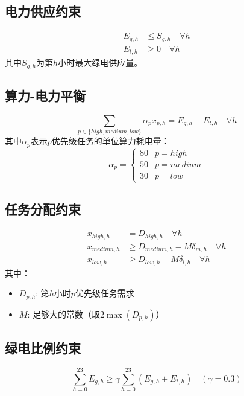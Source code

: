 \documentclass{article}
\begin{document}
\subsection{电力供应约束}
\begin{align}
E_{g,h} &\leq S_{g,h} \quad \forall h \label{eq:green_supply} \\
E_{t,h} &\geq 0 \quad \forall h \label{eq:trad_supply}
\end{align}
其中$S_{g,h}$为第$h$小时最大绿电供应量。

\subsection{算力-电力平衡}
\begin{equation}
\sum_{p \in \{high,medium,low\}} \alpha_p x_{p,h} = E_{g,h} + E_{t,h} \quad \forall h
\end{equation}
其中$\alpha_p$表示$p$优先级任务的单位算力耗电量：
$$
\alpha_p =
\begin{cases}
80 & p=high \\
50 & p=medium \\
30 & p=low
\end{cases}
$$

\subsection{任务分配约束}
\begin{align}
x_{high,h} &= D_{high,h} \quad \forall h \label{eq:high_task} \\
x_{medium,h} &\geq D_{medium,h} - M\delta_{m,h} \quad \forall h \label{eq:medium_task} \\
x_{low,h} &\geq D_{low,h} - M\delta_{l,h} \quad \forall h \label{eq:low_task}
\end{align}
其中：
\begin{itemize}
\item $D_{p,h}$: 第$h$小时$p$优先级任务需求
\item $M$: 足够大的常数（取$2\max(D_{p,h})$）
\end{itemize}

\subsection{绿电比例约束}
\begin{equation}
\sum_{h=0}^{23} E_{g,h} \geq \gamma \sum_{h=0}^{23} (E_{g,h} + E_{t,h}) \quad (\gamma=0.3)
\end{equation}
\end{document}

